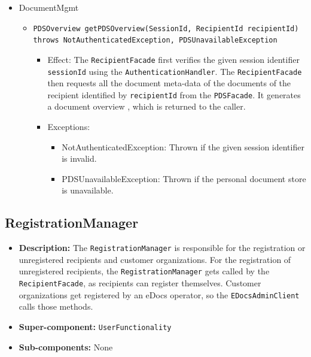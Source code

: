\documentclass[a4paper,10pt]{article}
\begin{document}
\begin{itemize}
    \item DocumentMgmt
    \begin{itemize}
        \item \texttt{PDSOverview getPDSOverview(SessionId, RecipientId recipientId)\\ throws NotAuthenticatedException, PDSUnavailableException}
        \begin{itemize}
            \item Effect: The \texttt{RecipientFacade} first verifies the given session identifier \texttt{sessionId} using the \texttt{AuthenticationHandler}. The \texttt{RecipientFacade} then requests all the document meta-data of the documents of the recipient identified by \texttt{recipientId} from the \texttt{PDSFacade}. It generates a document overview , which is returned  to the caller.
            \item Exceptions:
             \begin{itemize}
                \item NotAuthenticatedException: Thrown if the given session identifier is invalid.
                \item PDSUnavailableException: Thrown if the personal document store is unavailable.
            \end{itemize}
            	
        \end{itemize}
    \end{itemize}
\end{itemize}

\subsection{RegistrationManager}
\begin{itemize}
    \item \textbf{Description:} The \texttt{RegistrationManager} is responsible for the registration or unregistered recipients and customer organizations. For the registration of unregistered recipients, the \texttt{RegistrationManager} gets called by the \texttt{RecipientFacade}, as recipients can register themselves. Customer organizations get registered by an eDocs operator, so the \texttt{EDocsAdminClient} calls those methods.
    \item \textbf{Super-component:} \texttt{UserFunctionality}
    \item \textbf{Sub-components:} None
\end{itemize}
\end{document}
